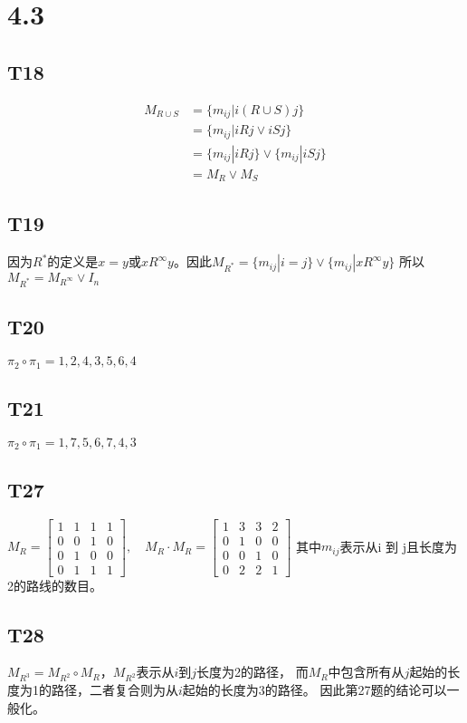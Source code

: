 \documentclass{article}
\begin{document}
\section{4.3}
\subsection{T18}
\begin{align*}
    M_{R \cup S} &= \{m_{ij} | i (R \cup S) j\}\\
    &= \{m_{ij} | iRj \lor iSj\}\\
    &= \{m_{ij} | iRj\} \lor \{m_{ij} | iSj\}\\
    &= M_R \lor M_S
\end{align*}
\subsection{T19}
因为$R^*$的定义是$x = y$或$x R^{\infty} y$。因此$M_{R^*} = \{m_{ij} | i = j\} \lor \{m_{ij} | x R^{\infty} y\}$
所以$M_{R^*} = M_{R^{\infty}} \lor I_n$
\subsection{T20}
$\pi_2 \circ \pi_1 = 1, 2, 4, 3, 5, 6, 4$
\subsection{T21}
$\pi_2 \circ \pi_1 = 1, 7, 5, 6, 7, 4, 3$
\subsection{T27}
$M_R = 
\begin{bmatrix}
    1 & 1 & 1 & 1\\
    0 & 0 & 1 & 0\\
    0 & 1 & 0 & 0\\
    0 & 1 & 1 & 1
\end{bmatrix}
,\quad M_R \cdot M_R = 
\begin{bmatrix}
    1 & 3 & 3 & 2\\
    0 & 1 & 0 & 0\\
    0 & 0 & 1 & 0\\
    0 & 2 & 2 & 1
\end{bmatrix}$
其中$m_{ij}$表示从i 到 j且长度为2的路线的数目。
\subsection{T28}
$M_{R^3} = M_{R^2} \circ M_R$，$M_{R^2}$表示从$i$到$j$长度为2的路径，
而$M_R$中包含所有从$j$起始的长度为1的路径，二者复合则为从$i$起始的长度为3的路径。
因此第27题的结论可以一般化。
\end{document}
